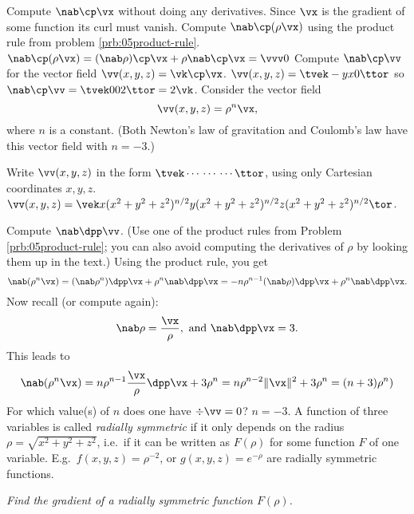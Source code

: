 \begin{multicols}{2}
\subprob Compute $\nab\cp\vx$ without doing any derivatives.  
\answer
Since $\vx$ is the gradient of some function its curl must vanish.
\endanswer
\subprob Compute $\nab\cp(\rho\vx)$ using the product rule from 
problem \ref{prb:05product-rule}.
\answer
$\nab\cp(\rho\vx) = (\nab \rho)\cp \vx + \rho \nab\cp\vx = \vvv0$
\endanswer
\problem Compute $\nab\cp\vv$ for the vector field 
$\vv(x, y, z) = \vk\cp\vx$.
\answer
$\vv(x, y, z) = \tvek -y \\x \\ 0\ttor$
so $\nab\cp\vv = \tvek 0\\0\\2\ttor = 2\vk$.
\endanswer
\problem\label{prb:05div-rho-n-x} Consider the vector field
\[
\vv(x, y, z) = \rho^n \vx,
\]
where $n$ is a constant.   (Both Newton's law of gravitation
and Coulomb's law have this vector field with $n=-3$.)

\subprob Write $\vv(x, y, z)$ in the form $\tvek \cdots\\\cdots\\\cdots\ttor$, 
using only Cartesian coordinates $x, y, z$.
\answer
$\vv(x, y, z) =
\vek
   x(x^2+y^2+z^2)^{n/2} \\ y(x^2+y^2+z^2)^{n/2} \\ z(x^2+y^2+z^2)^{n/2}
\tor$.
\endanswer


\subprob Compute $\nab\dpp\vv$.  (Use one of the product rules from Problem
\ref{prb:05product-rule}; you can also avoid computing the derivatives of $\rho$
by looking them up in the text.)
\answer
Using the product rule, you get
\[
\nab(\rho^{n}\vx)
= (\nab \rho^{n})\dpp\vx + \rho^{n}\nab\dpp\vx
= -n\rho^{n-1}(\nab\rho)\dpp\vx + \rho^{n}\nab\dpp\vx.
\]
Now recall (or compute again):
\[
\nab \rho = \frac{\vx} {\rho}, \text{ and }
\nab\dpp\vx = 3.
\]
This leads to
\[
\nab(\rho^{n}\vx)
= n \rho^{n-1}\frac{\vx} {\rho}\dpp\vx + 3 \rho^{n}
= n \rho^{n-2}\|\vx\|^2 + 3 \rho^{n}
= (n+3) \rho^{n})
\]
\endanswer
\subprob For which value(s) of $n$ does one have $\div \vv = 0$? 
\answer
$n=-3$.
\endanswer
\problem\label{prb:05grad-Frho} A function of three variables
is called \emph{radially symmetric}
if it only depends on the radius $\rho = \sqrt{x^2+y^2+z^2}$, i.e.\
if it can be written as $F(\rho)$ for some function $F$ of one variable.
E.g.\ $f(x, y, z) = \rho^{-2}$, or $g(x, y, z) = e^{-\rho}$ are radially
symmetric functions.  

\noindent%
\textit{Find the gradient of a radially symmetric function $F(\rho)$.}


\end{multicols}

